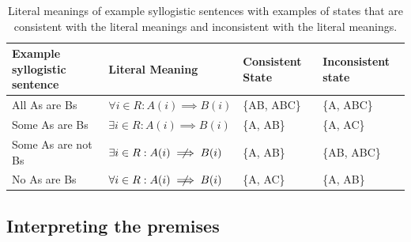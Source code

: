 \documentclass[floatsintext, doc]{apa6}
\begin{document}
\begin{table}[]
\begin{tabular}{@{}llll@{}}
\toprule
Example syllogistic sentence & Literal Meaning                                                                       & Consistent State & Inconsistent state \\ \midrule
All As are Bs                                      & $\forall i \in R: A(i) \implies B(i) $ & \{AB, ABC\}                           & \{A, ABC\}                              \\
Some As are Bs                                     & $\exists i \in R: A(i) \implies B(i) $ & \{A, AB\}                             & \{A, AC\}                               \\
Some As are not Bs                                 & $\exists i \in R: A(i)  \centernot \implies B(i) $ & \{A, AB\}                             & \{AB, ABC\}                             \\
No As are Bs                                       & $\forall i \in R: A(i) \centernot \implies B(i) $  & \{A, AC\}                             & \{A, AB\} \\ \bottomrule
\end{tabular}
\caption{Literal meanings of example syllogistic sentences with examples of states that are consistent with the literal meanings and inconsistent with the literal meanings.}
\label{tab:sem}
\end{table}

\subsection{Interpreting the premises}
\end{document}
